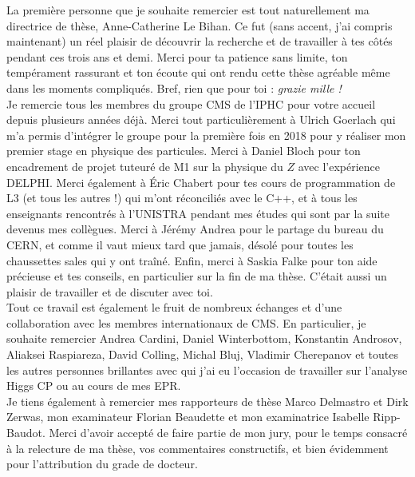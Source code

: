 
La première personne que je souhaite remercier est tout naturellement ma directrice de thèse, Anne-Catherine Le Bihan. Ce fut (sans accent, j'ai compris maintenant) un réel plaisir de découvrir la recherche et de travailler à tes côtés pendant ces trois ans et demi. Merci pour ta patience sans limite, ton tempérament rassurant et ton écoute qui ont rendu cette thèse agréable même dans les moments compliqués. Bref, rien que pour toi : \textit{grazie mille !} \\

Je remercie tous les membres du groupe CMS de l'IPHC pour votre accueil depuis plusieurs années déjà. Merci tout particulièrement à Ulrich Goerlach qui m'a permis d'intégrer le groupe pour la première fois en 2018 pour y réaliser mon premier stage en physique des particules. Merci à Daniel Bloch pour ton encadrement de projet tuteuré de M1 sur la physique du $Z$ avec l'expérience DELPHI. Merci également à Éric Chabert pour tes cours de programmation de L3 (et tous les autres !) qui m'ont réconciliés avec le C++, et à tous les enseignants rencontrés à l'UNISTRA pendant mes études qui sont par la suite devenus mes collègues. Merci à Jérémy Andrea pour le partage du bureau du CERN, et comme il vaut mieux tard que jamais, désolé pour toutes les chaussettes sales qui y ont traîné. Enfin, merci à Saskia Falke pour ton aide précieuse et tes conseils, en particulier sur la fin de ma thèse. C'était aussi un plaisir de travailler et de discuter avec toi. \\

Tout ce travail est également le fruit de nombreux échanges et d'une collaboration avec les membres internationaux de CMS. En particulier, je souhaite remercier Andrea Cardini, Daniel Winterbottom, Konstantin Androsov, Aliaksei Raspiareza, David Colling, Michal Bluj, Vladimir Cherepanov et toutes les autres personnes brillantes avec qui j'ai eu l'occasion de travailler sur l'analyse Higgs CP ou au cours de mes EPR. \\

Je tiens également à remercier mes rapporteurs de thèse Marco Delmastro et Dirk Zerwas, mon examinateur Florian Beaudette et mon examinatrice Isabelle Ripp-Baudot. Merci d'avoir accepté de faire partie de mon jury, pour le temps consacré à la relecture de ma thèse, vos commentaires constructifs, et bien évidemment pour l'attribution du grade de docteur. \\

